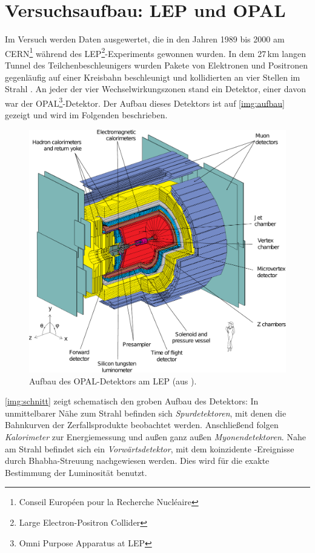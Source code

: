\section{Versuchsaufbau: LEP und OPAL}
\label{sec:setup}
Im Versuch werden Daten ausgewertet, die in den Jahren 1989 bis 2000 am
CERN\footnote{Conseil Européen pour la Recherche Nucléaire} während des
LEP\footnote{Large Electron-Positron Collider}-Experiments gewonnen wurden.
In dem 27\,km langen Tunnel des Teilchenbeschleunigers wurden Pakete von
Elektronen und Positronen gegenläufig auf einer Kreisbahn beschleunigt
und kollidierten an vier Stellen im Strahl \cite{manual}.
An jeder der vier Wechselwirkungszonen stand ein Detektor, einer davon war der
OPAL\footnote{Omni Purpose Apparatus at LEP}-Detektor.
Der Aufbau dieses Detektors ist auf \autoref{img:aufbau} gezeigt und wird im Folgenden beschrieben.

\begin{figure}[H]
    \begin{center}
        \includegraphics[width=\textwidth]{../img/aufbau.pdf}
        \caption{Aufbau des OPAL-Detektors am LEP (aus \cite{manualmuc}).}
        \label{img:aufbau}
    \end{center}
\end{figure}

\autoref{img:schnitt} zeigt schematisch den groben Aufbau des Detektors:
In unmittelbarer Nähe zum Strahl befinden sich \emph{Spurdetektoren},
mit denen die Bahnkurven der Zerfallsprodukte beobachtet werden.
Anschließend folgen \emph{Kalorimeter} zur Energiemessung und außen ganz außen \emph{Myonendetektoren}.  
Nahe am Strahl befindet sich ein \emph{Vorwärtsdetektor},
mit dem koinzidente \ee-Ereignisse durch Bhabha-Streuung nachgewiesen
werden. Dies wird für die exakte Bestimmung der Luminosität benutzt.

